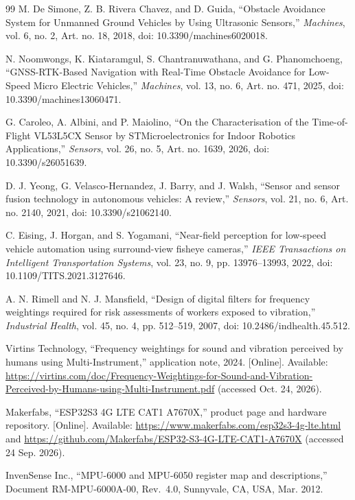 \begin{thebibliography}{99}
 M. De Simone, Z. B. Rivera Chavez, and D. Guida, ``Obstacle Avoidance System for Unmanned Ground Vehicles by Using Ultrasonic Sensors,'' \emph{Machines}, vol. 6, no. 2, Art. no. 18, 2018, doi: 10.3390/machines6020018.

 N. Noomwongs, K. Kiataramgul, S. Chantranuwathana, and G. Phanomchoeng, ``GNSS-RTK-Based Navigation with Real-Time Obstacle Avoidance for Low-Speed Micro Electric Vehicles,'' \emph{Machines}, vol. 13, no. 6, Art. no. 471, 2025, doi: 10.3390/machines13060471.

 G. Caroleo, A. Albini, and P. Maiolino, ``On the Characterisation of the Time-of-Flight VL53L5CX Sensor by STMicroelectronics for Indoor Robotics Applications,'' \emph{Sensors}, vol. 26, no. 5, Art. no. 1639, 2026, doi: 10.3390/s26051639.

 D. J. Yeong, G. Velasco-Hernandez, J. Barry, and J. Walsh, ``Sensor and sensor fusion technology in autonomous vehicles: A review,'' \emph{Sensors}, vol. 21, no. 6, Art. no. 2140, 2021, doi: 10.3390/s21062140.

 C. Eising, J. Horgan, and S. Yogamani, ``Near-field perception for low-speed vehicle automation using surround-view fisheye cameras,'' \emph{IEEE Transactions on Intelligent Transportation Systems}, vol. 23, no. 9, pp. 13976--13993, 2022, doi: 10.1109/TITS.2021.3127646.

 A. N. Rimell and N. J. Mansfield, ``Design of digital filters for frequency weightings required for risk assessments of workers exposed to vibration,'' \emph{Industrial Health}, vol. 45, no. 4, pp. 512--519, 2007, doi: 10.2486/indhealth.45.512.

 Virtins Technology, ``Frequency weightings for sound and vibration perceived by humans using Multi-Instrument,'' application note, 2024. [Online]. Available: \url{https://virtins.com/doc/Frequency-Weightings-for-Sound-and-Vibration-Perceived-by-Humans-using-Multi-Instrument.pdf} (accessed Oct. 24, 2026).

 Makerfabs, ``ESP32S3 4G LTE CAT1 A7670X,'' product page and hardware repository. [Online]. Available: \url{https://www.makerfabs.com/esp32s3-4g-lte.html} and \url{https://github.com/Makerfabs/ESP32-S3-4G-LTE-CAT1-A7670X} (accessed 24 Sep. 2026).

 InvenSense Inc., ``MPU-6000 and MPU-6050 register map and descriptions,'' Document RM-MPU-6000A-00, Rev.~4.0, Sunnyvale, CA, USA, Mar. 2012.


\end{thebibliography}
